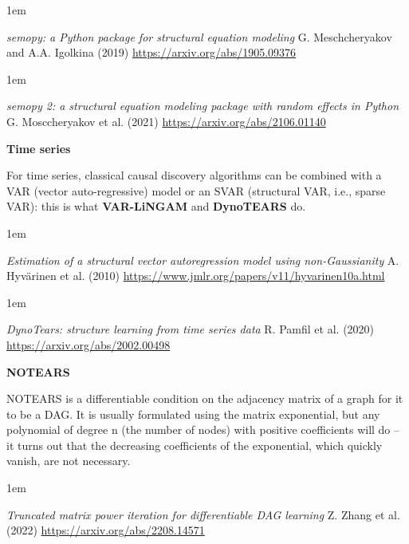 \documentclass[a5paper]{article}
\let\d\textbf
\newenvironment{reference}{%
  \medskip\goodbreak
  \parskip 0pt
  \raggedright
  \leftskip 1em
  \obeylines
}{\par\medskip\goodbreak}
\def\subsection#1{{\par\bigskip\goodbreak\large\bfseries #1\par}}
\begin{document}
\begin{reference}
  \emph{semopy: a Python package  for structural equation modeling}
  G. Meschcheryakov and A.A. Igolkina (2019)
  \url{https://arxiv.org/abs/1905.09376}
\end{reference}

\begin{reference}
  \emph{semopy 2: a structural equation modeling package with random effects in Python}
  G. Mosccheryakov et al. (2021)
  \url{https://arxiv.org/abs/2106.01140}
\end{reference}

\subsection{Time series}

For time series, classical causal discovery algorithms can be combined with a VAR
(vector auto-regressive) model or an SVAR (structural VAR, i.e., sparse VAR):
this is what \d{VAR-LiNGAM} and \d{DynoTEARS} do.

\begin{reference}
  \emph{Estimation of a structural vector autoregression model using non-Gaussianity}
  A. Hyvärinen et al. (2010)
  \url{https://www.jmlr.org/papers/v11/hyvarinen10a.html}
\end{reference}

\begin{reference}
  \emph{DynoTears:  structure learning from time series data}
  R. Pamfil et al. (2020)
  \url{https://arxiv.org/abs/2002.00498}
\end{reference}

\subsection{NOTEARS}

NOTEARS is a differentiable condition on the adjacency matrix
of a graph for it to be a DAG.
It is usually formulated using the matrix exponential,
but any polynomial of degree n (the number of nodes)
with positive coefficients will do -- it turns out that the decreasing coefficients
of the exponential, which quickly vanish, are not necessary.

\begin{reference}
  \emph{Truncated matrix power iteration  for differentiable DAG learning}
  Z. Zhang et al. (2022)
  \url{https://arxiv.org/abs/2208.14571}
\end{reference}
\end{document}
